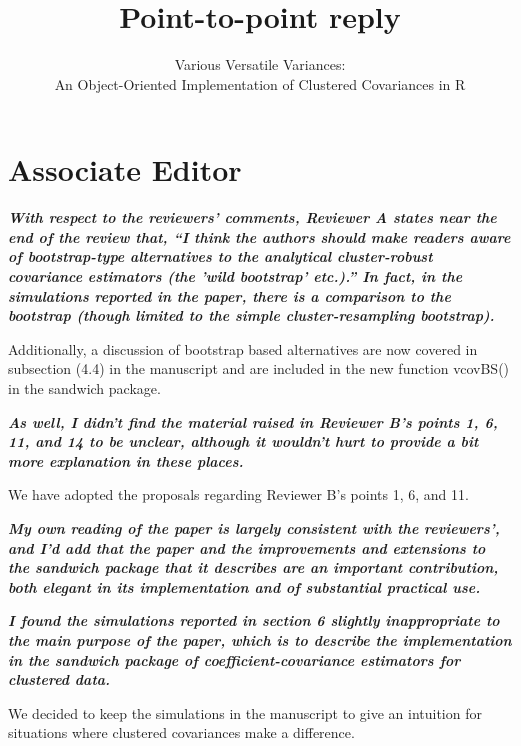 \documentclass[10pt,a4paper]{article}
\begin{document}
\title{Point-to-point reply}
\author{Various Versatile Variances:\\ An Object-Oriented Implementation of Clustered Covariances in R}
\date{}
\maketitle

\section*{Associate Editor}

\textbf{\textit{With respect to the reviewers' comments, Reviewer A states near the end of
the review that, ``I think the authors should make readers aware of
bootstrap-type alternatives to the analytical cluster-robust covariance
estimators (the 'wild bootstrap' etc.).'' In fact, in the simulations
reported in the paper, there is a comparison to the bootstrap (though
limited to the simple cluster-resampling bootstrap).}}

\medskip

Additionally, a discussion of bootstrap based alternatives are now covered in subsection (4.4) in the manuscript and are included in the new function vcovBS() in the sandwich package.

\medskip

\textbf{\textit{As well, I didn't find the material raised in Reviewer B's points 1, 6, 11,
and 14 to be unclear, although it wouldn't hurt to provide a bit more
explanation in these places.}}

\medskip

We have adopted the proposals regarding Reviewer B's points 1, 6, and 11.

\medskip

\textbf{\textit{My own reading of the paper is largely consistent with the reviewers', and
I'd add that the paper and the improvements and extensions to the sandwich
package that it describes are an important contribution, both elegant in its
implementation and of substantial practical use.}}

\medskip

\textbf{\textit{I found the simulations reported in section 6 slightly inappropriate to the
main purpose of the paper, which is to describe the implementation in the
sandwich package of coefficient-covariance estimators for clustered data.}}

\medskip

We decided to keep the simulations in the manuscript to give an intuition for situations where clustered covariances make a difference.
\end{document}
